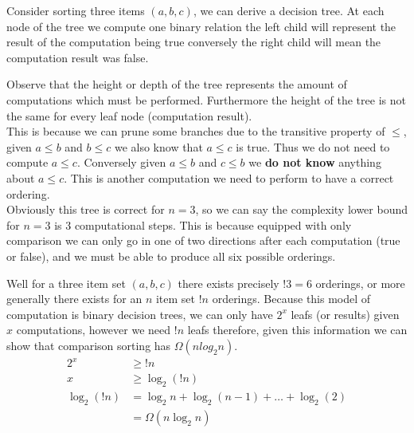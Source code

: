 Consider sorting three items $(a,b,c)$,
we can derive a decision tree.
At each node of the tree we compute one binary relation
the left child will represent the result of the computation being true
conversely the right child will mean the computation result was false.
\begin{center}
\end{center}

Observe that the height or depth of the tree represents the amount of computations which must be performed.
Furthermore the height of the tree is not the same for every leaf node (computation result).\\

This is because we can prune some branches due to the transitive property of $\leq$,
given $a \leq b$ and $b \leq c$ we also know that $a \leq c$ is true.
Thus we do not need to compute $a \leq c$.
Conversely given $a \leq b$ and $c \leq b$ we \textbf{do not know}
anything about $a \leq c$.
This is another computation we need to perform to have a correct ordering.\\

Obviously this tree is correct for $n = 3$, so we can say
the complexity lower bound for $n = 3$ is 3 computational steps.
This is because equipped with only comparison we can only go in one
of two directions after each computation (true or false),
and we must be able to produce all six possible orderings.

Well for a three item set $(a,b,c)$ there exists precisely $!3 = 6$ orderings,
or more generally there exists for an $n$ item set $!n$ orderings.
Because this model of computation is binary decision trees,
we can only have $2^x$ leafs (or results) given $x$ computations,
however we need $!n$ leafs therefore, given this information
we can show that comparison sorting has $\Omega(n log_2 n)$.
\begin{align*}
    2^x &\geq !n \\
    x &\geq \log_2(!n) \\
    \log_2(!n) &= \log_2n + \log_2(n − 1) + \dots + \log_2(2)\\
               &= \Omega(n\log_2n)
\end{align*}

